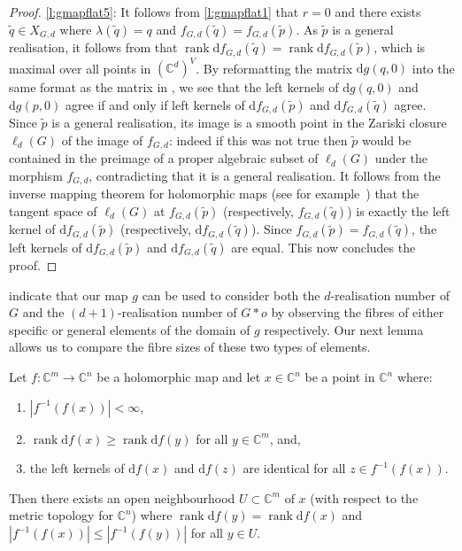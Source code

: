\documentclass[ALCO]{cedram}
\DeclareMathOperator{\rank}{rank}
\newcommand{\diff}{\mathrm{d}}
\begin{document}
\begin{proof}
	\ref{l:gmapflat5}:
	It follows from \ref{l:gmapflat1} that $r=0$ and there exists $\tilde{q} \in X_{G,d}$ where $\lambda(\tilde{q}) = q$ and $f_{G,d}(\tilde{q})=f_{G,d}(\tilde{p})$.
	As $\tilde{p}$ is a general realisation, it follows from  that $\rank \diff f_{G,d}(\tilde{q}) = \rank \diff f_{G,d}(\tilde{p})$,
	which is maximal over all points in $(\mathbb{C}^d)^V$.
	By reformatting the matrix $\diff g(q,0)$ into the same format as the matrix in ,
	we see that the left kernels of $\diff g(q,0)$ and $\diff g(p,0)$ agree if and only if left kernels of $\diff f_{G,d}(\tilde{p})$ and $\diff f_{G,d}(\tilde{q})$ agree.
	Since $\tilde{p}$ is a general realisation,
	its image is a smooth point in the Zariski closure $\ell_d(G)$ of the image of $f_{G,d}$:
	indeed if this was not true then $\tilde{p}$ would be contained in the preimage of a proper algebraic subset of $\ell_d(G)$ under the morphism $f_{G,d}$, contradicting that it is a general realisation.
	It follows from the inverse mapping theorem for holomorphic maps (see for example~\cite[Chapter~I, Theorem~7.5]{FG02}) that the tangent space of $\ell_d(G)$ at $f_{G,d}(\tilde{p})$ (respectively, $f_{G,d}(\tilde{q})$) is exactly the left kernel of $\diff f_{G,d}(\tilde{p})$ (respectively, $\diff f_{G,d}(\tilde{q})$).
	Since $f_{G,d}(\tilde{p}) = f_{G,d}(\tilde{q})$,
	the left kernels of $\diff f_{G,d}(\tilde{p})$ and $\diff f_{G,d}(\tilde{q})$ are equal.
	This now concludes the proof.
\end{proof}


 indicate that our map $g$ can be used to consider both the $d$-realisation number of $G$ and the $(d+1)$-realisation number of $G*o$ by observing the fibres of either specific or general elements of the domain of $g$ respectively.
Our next lemma allows us to compare the fibre sizes of these two types of elements.


\begin{lemma}\label{l:diffmaprealisations}
	Let $f : \mathbb{C}^m \rightarrow \mathbb{C}^n$ be a holomorphic map and let $x \in \mathbb{C}^n$ be a point in $\mathbb{C}^n$ where:
	\begin{enumerate}
		\item $|f^{-1}(f(x))|< \infty$,
		\item $\rank \diff f (x) \geq \rank \diff f(y)$ for all $y \in \mathbb{C}^m$, and,
		\item the left kernels of $\diff f(x)$ and $\diff f(z)$ are identical for all $z \in f^{-1}(f(x))$.
	\end{enumerate}
	Then there exists an open neighbourhood $U \subset \mathbb{C}^m$ of $x$ (with respect to the metric topology for $\mathbb{C}^n$) where $\rank \diff f (y) = \rank \diff f(x)$ and $| f^{-1}(f(x))| \leq |f^{-1}(f(y))|$ for all $y \in U$.
\end{lemma}
\end{document}
